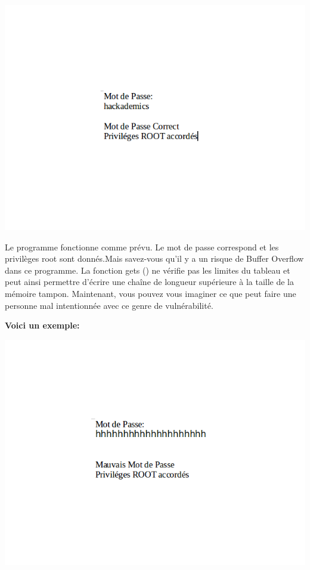 \begin{center}
\includegraphics[scale=0.5]{Application/assets/bmdp.png}
\end{center}

\begin{flushleft}
Le programme fonctionne comme prévu. Le mot de passe correspond et les privilèges root sont donnés.Mais savez-vous qu'il y a un risque de Buffer Overflow dans ce programme. La fonction gets () ne vérifie pas les limites du tableau et peut ainsi permettre d'écrire une chaîne de longueur supérieure à la taille de la mémoire tampon. Maintenant, vous pouvez vous imaginer ce que peut faire une personne mal intentionnée avec ce genre de vulnérabilité.
\end{flushleft}


\begin{flushleft}
\textbf{Voici un exemple:}
\end{flushleft}

\begin{center}
\includegraphics[scale=0.5]{Application/assets/mmdp.png}
\end{center}


